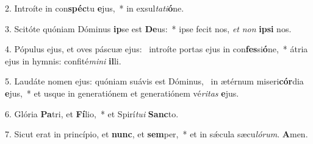 2. Introíte in con\textbf{spéc}tu \textbf{e}jus,~*  in exsul\textit{ta}\textit{ti}\textbf{ó}ne.\

3. Scitóte quóniam Dóminus \textbf{ip}se est \textbf{De}us:~*  ipse fecit nos, \textit{et} \textit{non} \textbf{ip}\textbf{si} nos.\

4. Pópulus ejus, et oves páscuæ ejus: \dag\  introíte portas ejus in con\textbf{fes}si\textbf{ó}ne,~*  átria ejus in hymnis: confité\textit{mi}\textit{ni} \textbf{il}li.\

5. Laudáte nomen ejus: quóniam suávis est Dóminus, \dag\  in ætérnum miseri\textbf{cór}dia \textbf{e}jus,~*  et usque in generatiónem et generatiónem vé\textit{ri}\textit{tas} \textbf{e}jus.\

6. Glória \textbf{Pa}tri, et \textbf{Fí}lio,~*  et Spirí\textit{tu}\textit{i} \textbf{Sanc}to.\

7. Sicut erat in princípio, et \textbf{nunc}, et \textbf{sem}per,~*  et in sǽcula sæcu\textit{ló}\textit{rum}. \textbf{A}men.\

